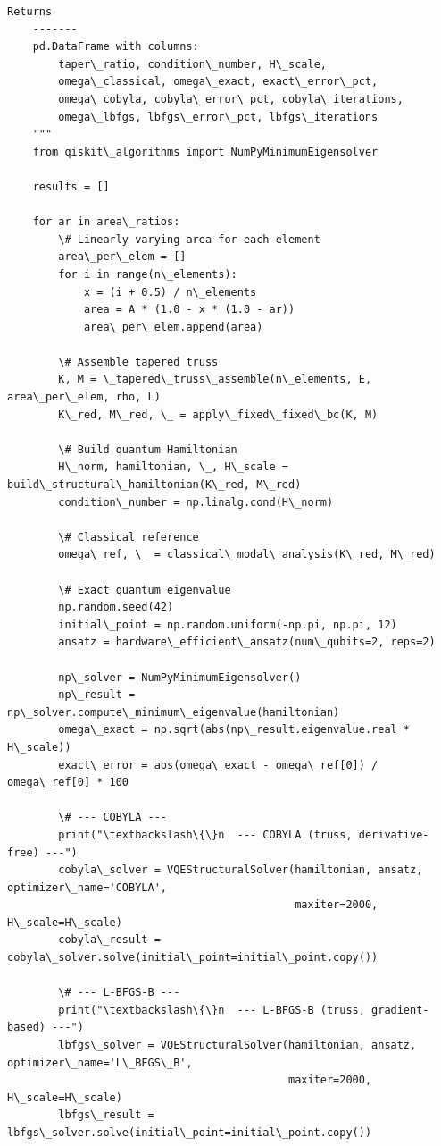 \documentclass[12pt, a4paper]{article}
\begin{document}
\begin{lstlisting}[style=codestyle, caption={{novel_study.py --- Ill-Conditioning & Damage Detection}}]
    Returns
    -------
    pd.DataFrame with columns:
        taper\_ratio, condition\_number, H\_scale,
        omega\_classical, omega\_exact, exact\_error\_pct,
        omega\_cobyla, cobyla\_error\_pct, cobyla\_iterations,
        omega\_lbfgs, lbfgs\_error\_pct, lbfgs\_iterations
    """
    from qiskit\_algorithms import NumPyMinimumEigensolver

    results = []

    for ar in area\_ratios:
        \# Linearly varying area for each element
        area\_per\_elem = []
        for i in range(n\_elements):
            x = (i + 0.5) / n\_elements
            area = A * (1.0 - x * (1.0 - ar))
            area\_per\_elem.append(area)

        \# Assemble tapered truss
        K, M = \_tapered\_truss\_assemble(n\_elements, E, area\_per\_elem, rho, L)
        K\_red, M\_red, \_ = apply\_fixed\_fixed\_bc(K, M)

        \# Build quantum Hamiltonian
        H\_norm, hamiltonian, \_, H\_scale = build\_structural\_hamiltonian(K\_red, M\_red)
        condition\_number = np.linalg.cond(H\_norm)

        \# Classical reference
        omega\_ref, \_ = classical\_modal\_analysis(K\_red, M\_red)

        \# Exact quantum eigenvalue
        np.random.seed(42)
        initial\_point = np.random.uniform(-np.pi, np.pi, 12)
        ansatz = hardware\_efficient\_ansatz(num\_qubits=2, reps=2)

        np\_solver = NumPyMinimumEigensolver()
        np\_result = np\_solver.compute\_minimum\_eigenvalue(hamiltonian)
        omega\_exact = np.sqrt(abs(np\_result.eigenvalue.real * H\_scale))
        exact\_error = abs(omega\_exact - omega\_ref[0]) / omega\_ref[0] * 100

        \# --- COBYLA ---
        print("\textbackslash\{\}n  --- COBYLA (truss, derivative-free) ---")
        cobyla\_solver = VQEStructuralSolver(hamiltonian, ansatz, optimizer\_name='COBYLA',
                                             maxiter=2000, H\_scale=H\_scale)
        cobyla\_result = cobyla\_solver.solve(initial\_point=initial\_point.copy())

        \# --- L-BFGS-B ---
        print("\textbackslash\{\}n  --- L-BFGS-B (truss, gradient-based) ---")
        lbfgs\_solver = VQEStructuralSolver(hamiltonian, ansatz, optimizer\_name='L\_BFGS\_B',
                                            maxiter=2000, H\_scale=H\_scale)
        lbfgs\_result = lbfgs\_solver.solve(initial\_point=initial\_point.copy())


\end{lstlisting}
\end{document}
